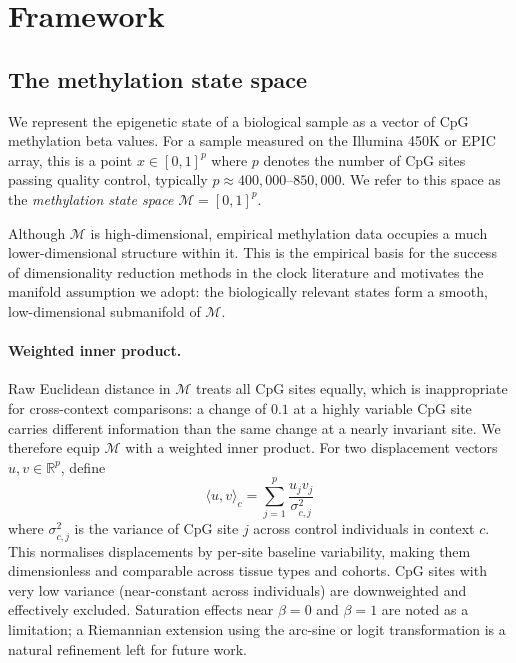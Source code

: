 \section{Framework}
\label{sec:framework}

\subsection{The methylation state space}
\label{sec:statespace}

We represent the epigenetic state of a biological sample as a vector of CpG
methylation beta values. For a sample measured on the Illumina 450K or EPIC array,
this is a point $x \in [0,1]^p$ where $p$ denotes the number of CpG sites passing
quality control, typically $p \approx 400{,}000$--$850{,}000$. We refer to this
space as the \emph{methylation state space} $\mathcal{M} = [0,1]^p$.

Although $\mathcal{M}$ is high-dimensional, empirical methylation data occupies a
much lower-dimensional structure within it. This is the empirical basis for the
success of dimensionality reduction methods in the clock literature and motivates
the manifold assumption we adopt: the biologically relevant states form a smooth,
low-dimensional submanifold of $\mathcal{M}$.

\paragraph{Weighted inner product.}
Raw Euclidean distance in $\mathcal{M}$ treats all CpG sites equally, which is
inappropriate for cross-context comparisons: a change of $0.1$ at a highly variable
CpG site carries different information than the same change at a nearly invariant
site. We therefore equip $\mathcal{M}$ with a weighted inner product. For two
displacement vectors $u, v \in \mathbb{R}^p$, define
\begin{equation}
  \langle u, v \rangle_c = \sum_{j=1}^{p} \frac{u_j v_j}{\sigma_{c,j}^2}
  \label{eq:inner}
\end{equation}
where $\sigma_{c,j}^2$ is the variance of CpG site $j$ across control individuals
in context $c$. This normalises displacements by per-site baseline variability,
making them dimensionless and comparable across tissue types and cohorts.
CpG sites with very low variance (near-constant across individuals) are downweighted
and effectively excluded. Saturation effects near $\beta = 0$ and $\beta = 1$ are
noted as a limitation; a Riemannian extension using the arc-sine or logit
transformation is a natural refinement left for future work.

